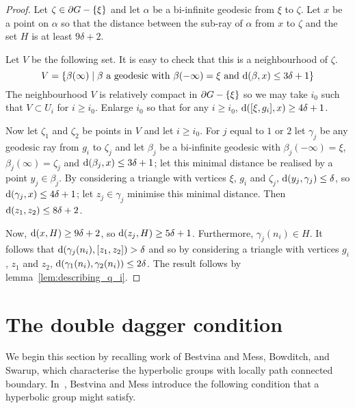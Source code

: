 \documentclass[a4paper]{article}
\begin{document}
\begin{proof}
  Let $\zeta \in \partial G - \left\{\xi\right\}$ and let $\alpha$ be a bi-infinite
  geodesic from $\xi$ to $\zeta$. Let $x$ be a point on $\alpha$ so that the
  distance between the sub-ray of $\alpha$ from $x$ to $\zeta$ and the set $H$
  is at least $9\delta+2$.

  Let $V$ be the following set. It is easy to check that this is a
  neighbourhood of $\zeta$.
  \begin{equation*}
    V = \left\{\beta(\infty) \mid \text{$\beta$ a geodesic with
            $\beta(-\infty) = \xi$ and $\operatorname{d}(\beta, x) \leq 3\delta+1$}\right\}
  \end{equation*}
  The neighbourhood $V$ is relatively compact in $\partial G - \left\{\xi\right\}$ so
  we may take $i_0$ such that $V \subset U_i$ for $i \geq i_0$. Enlarge $i_0$
  so that for any $i \geq i_0$, $\operatorname{d}([\xi, g_i], x) \geq 4\delta+1$.

  Now let $\zeta_1$ and $\zeta_2$ be points in $V$ and let $i \geq i_0$. For
  $j$ equal to $1$ or $2$ let $\gamma_j$ be any geodesic ray from $g_i$ to
  $\zeta_j$ and let $\beta_j$ be a bi-infinite geodesic with $\beta_j(-\infty) =
  \xi$, $\beta_j(\infty) = \zeta_j$ and $\operatorname{d}(\beta_j, x) \leq 3\delta+1$; let
  this minimal distance be realised by a point $y_j \in \beta_j$. By
  considering a triangle with vertices $\xi$, $g_i$ and $\zeta_j$, $\operatorname{d}(y_j,
  \gamma_j) \leq \delta$, so $\operatorname{d}(\gamma_j, x) \leq 4\delta+1$; let $z_j \in
  \gamma_j$ minimise this minimal distance. Then $\operatorname{d}(z_1, z_2) \leq
  8\delta+2$.

  Now, $\operatorname{d}(x, H) \geq 9\delta+2$, so $\operatorname{d}(z_j, H) \geq 5\delta+1$.
  Furthermore, $\gamma_j(n_i) \in H$. It follows that $\operatorname{d}(\gamma_j(n_i), [z_1,
  z_2]) > \delta$ and so by considering a triangle with vertices $g_i$, $z_1$
  and $z_2$, $\operatorname{d}(\gamma_1(n_i), \gamma_2(n_i)) \leq 2\delta$. The result
  follows by lemma~\ref{lem:describing_q_i}. 
\end{proof}

\section{The double dagger condition}\label{sec:double_dagger}

We begin this section by recalling work of Bestvina and Mess, Bowditch, and
Swarup, which characterise the hyperbolic groups with locally path connected
boundary. In~\cite{bestvinamess91}, Bestvina and Mess introduce the following
condition that a hyperbolic group might satisfy.
\end{document}
